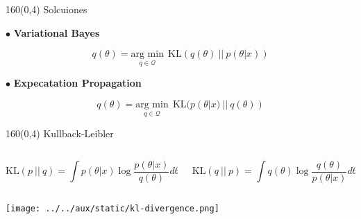 \documentclass[shownotes,aspectratio=169]{beamer}
\begin{document}
\begin{frame}[plain]
\begin{textblock}{160}(0,4)
\centering \Large Solcuiones
\end{textblock}

$\bullet$ \textbf{Variational Bayes}

\begin{equation*}
 q(\theta) = \underset{q \in \mathcal{Q}}{\text{arg min}} \ \ \text{KL}(q(\theta) \ || \ p(\theta|x))
\end{equation*}

\pause
\vspace{0.5cm}

$\bullet$ \textbf{Expecatation Propagation}

\begin{equation*}
 q(\theta) = \underset{q \in \mathcal{Q}}{\text{arg min}} \ \ \text{KL}(p(\theta|x) \ || \  q(\theta))
\end{equation*}

\end{frame}

\begin{frame}[plain]
 \begin{textblock}{160}(0,4)
\centering \Large Kullback-Leibler
\end{textblock}
\vspace{0.5cm}

\begin{columns}[t]
\begin{column}{0.5\textwidth}
\centering


 \begin{equation*}
 \text{KL}( p \ || \ q) = 
\int p(\theta|x) \log \frac{p(\theta|x)}{q(\theta)} d\theta
\end{equation*}

 \end{column}
 \begin{column}{0.5\textwidth}
\centering


\begin{equation*}
 \text{KL}(q \ || \ p) =  \int q(\theta) \log \frac{q(\theta)}{p(\theta|x)} d\theta
\end{equation*}

 
\end{column}
\end{columns}

 \vspace{0.5cm}

 \centering
 \texttt{[image: ../../aux/static/kl-divergence.png]}
 
 
\end{frame}
\end{document}
